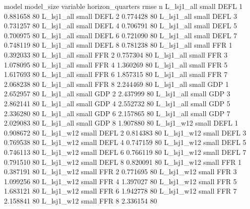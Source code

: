         model model_size variable  horizon_quarters     rmse  n
   L_lsj1_all      small     DEFL                 1 0.881658 80
   L_lsj1_all      small     DEFL                 2 0.774428 80
   L_lsj1_all      small     DEFL                 3 0.731257 80
   L_lsj1_all      small     DEFL                 4 0.706791 80
   L_lsj1_all      small     DEFL                 5 0.700975 80
   L_lsj1_all      small     DEFL                 6 0.721090 80
   L_lsj1_all      small     DEFL                 7 0.748119 80
   L_lsj1_all      small     DEFL                 8 0.781238 80
   L_lsj1_all      small      FFR                 1 0.392033 80
   L_lsj1_all      small      FFR                 2 0.757304 80
   L_lsj1_all      small      FFR                 3 1.078095 80
   L_lsj1_all      small      FFR                 4 1.360269 80
   L_lsj1_all      small      FFR                 5 1.617693 80
   L_lsj1_all      small      FFR                 6 1.857315 80
   L_lsj1_all      small      FFR                 7 2.068238 80
   L_lsj1_all      small      FFR                 8 2.244469 80
   L_lsj1_all      small      GDP                 1 2.652957 80
   L_lsj1_all      small      GDP                 2 2.437999 80
   L_lsj1_all      small      GDP                 3 2.862141 80
   L_lsj1_all      small      GDP                 4 2.552732 80
   L_lsj1_all      small      GDP                 5 2.336280 80
   L_lsj1_all      small      GDP                 6 2.157865 80
   L_lsj1_all      small      GDP                 7 2.029083 80
   L_lsj1_all      small      GDP                 8 1.907880 80
   L_lsj1_w12      small     DEFL                 1 0.908672 80
   L_lsj1_w12      small     DEFL                 2 0.814383 80
   L_lsj1_w12      small     DEFL                 3 0.769538 80
   L_lsj1_w12      small     DEFL                 4 0.747159 80
   L_lsj1_w12      small     DEFL                 5 0.746113 80
   L_lsj1_w12      small     DEFL                 6 0.766119 80
   L_lsj1_w12      small     DEFL                 7 0.791510 80
   L_lsj1_w12      small     DEFL                 8 0.820091 80
   L_lsj1_w12      small      FFR                 1 0.387191 80
   L_lsj1_w12      small      FFR                 2 0.771695 80
   L_lsj1_w12      small      FFR                 3 1.099256 80
   L_lsj1_w12      small      FFR                 4 1.397027 80
   L_lsj1_w12      small      FFR                 5 1.683121 80
   L_lsj1_w12      small      FFR                 6 1.942778 80
   L_lsj1_w12      small      FFR                 7 2.158841 80
   L_lsj1_w12      small      FFR                 8 2.336154 80
